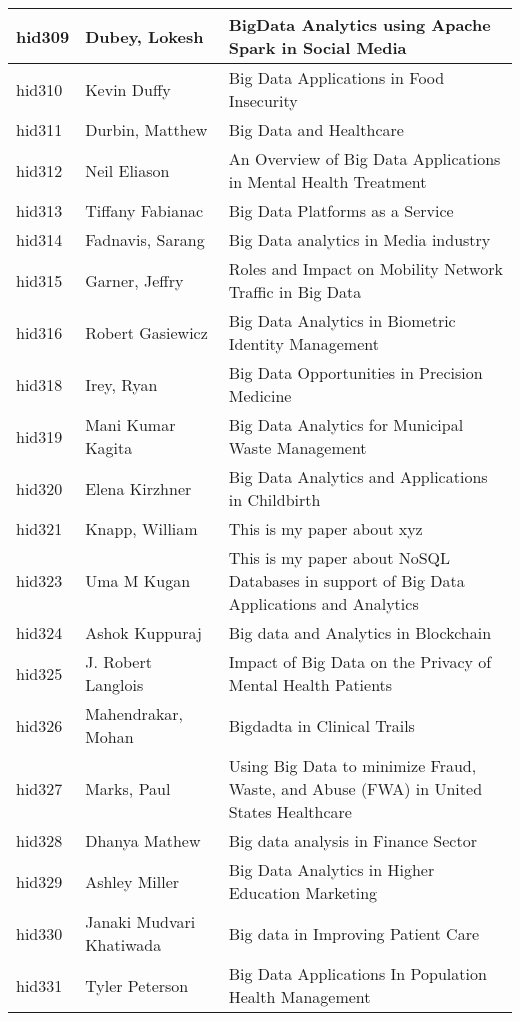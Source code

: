 \documentclass[12pt]{book}
\begin{document}
\begin{footnotesize}
\begin{longtable}{|p{1cm}p{5cm}p{9cm}|}
\hline
hid309 & Dubey, Lokesh & BigData Analytics using Apache Spark in Social Media  \\
\hline
hid310 & Kevin Duffy & Big Data Applications in Food Insecurity  \\
\hline
hid311 & Durbin, Matthew & Big Data and Healthcare  \\
\hline
hid312 & Neil Eliason & An Overview of Big Data Applications in Mental Health Treatment  \\
\hline
hid313 & Tiffany Fabianac & Big Data Platforms as a Service  \\
\hline
hid314 & Fadnavis, Sarang & Big Data analytics in Media industry  \\
\hline
hid315 & Garner, Jeffry & Roles and Impact on Mobility Network Traffic in Big Data  \\
\hline
hid316 & Robert Gasiewicz & Big Data Analytics in Biometric Identity Management  \\
\hline
hid318 & Irey, Ryan & Big Data Opportunities in Precision Medicine  \\
\hline
hid319 & Mani Kumar Kagita & Big Data Analytics for Municipal Waste Management  \\
\hline
hid320 & Elena Kirzhner & Big Data Analytics and Applications in Childbirth  \\
\hline
hid321 & Knapp, William & This is my paper about xyz  \\
\hline
hid323 & Uma M Kugan & This is my paper about NoSQL Databases in support of Big Data Applications and Analytics  \\
\hline
hid324 & Ashok Kuppuraj & Big data and Analytics in Blockchain  \\
\hline
hid325 & J. Robert Langlois & Impact of Big Data on the Privacy of Mental Health Patients  \\
\hline
hid326 & Mahendrakar, Mohan & Bigdadta in Clinical Trails  \\
\hline
hid327 & Marks, Paul & Using Big Data to minimize Fraud, Waste, and Abuse (FWA) in United States Healthcare  \\
\hline
hid328 & Dhanya Mathew & Big data analysis in Finance Sector  \\
\hline
hid329 & Ashley Miller & Big Data Analytics in Higher Education Marketing  \\
\hline
hid330 & Janaki Mudvari Khatiwada & Big data in Improving Patient Care  \\
\hline
hid331 & Tyler Peterson & Big Data Applications In Population Health Management  \\

\end{longtable}
\end{footnotesize}
\end{document}
